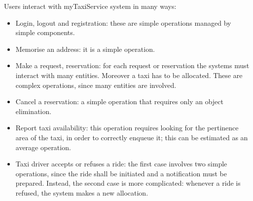 Users interact with myTaxiService system in many ways:
\begin{itemize}
	
	\item Login, logout and registration: these are simple operations managed by simple components.
	
	\item Memorise an address: it is a simple operation.
	
	\item Make a request, reservation: for each request or reservation the systems must interact with many entities. Moreover a taxi has to be allocated. These are complex operations, since many entities are involved.
	
	\item Cancel a reservation: a simple operation that requires only an object elimination. 
	
	\item Report taxi availability: this operation requires looking for the pertinence area of the taxi, in order to correctly enqueue it; this can be estimated as an average operation.
	
	\item Taxi driver accepts or refuses a ride: the first case involves two simple operations, since the ride shall be initiated and a notification must be prepared. Instead, the second case is more complicated: whenever a ride is refused, the system makes a new allocation.

\end{itemize}

\newcommand{\myWFP}{2.5cm}


